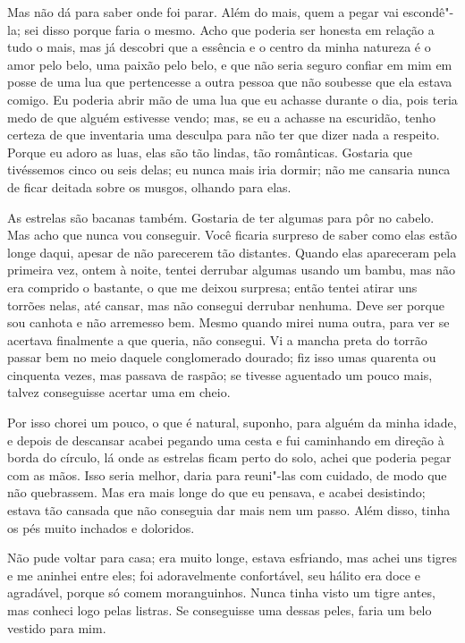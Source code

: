 Mas não dá para saber onde foi parar. Além do mais, quem a pegar vai
escondê"-la; sei disso porque faria o mesmo. Acho que poderia ser honesta em
relação a tudo o mais, mas já descobri que a essência e o centro da minha
natureza é o amor pelo belo, uma paixão pelo belo, e que não seria seguro
confiar em mim em posse de uma lua que pertencesse a outra pessoa que não
soubesse que ela estava comigo. Eu poderia abrir mão de uma lua que eu achasse
durante o dia, pois teria medo de que alguém estivesse vendo; mas, se eu a
achasse na escuridão, tenho certeza de que inventaria uma desculpa para não ter
que dizer nada a respeito. Porque eu adoro as luas, elas são tão lindas,
tão românticas. Gostaria que tivéssemos cinco ou seis delas; eu nunca mais
iria dormir; não me cansaria nunca de ficar deitada sobre os musgos, olhando para elas.

As estrelas são bacanas também. Gostaria de ter algumas para pôr no cabelo. Mas
acho que nunca vou conseguir. Você ficaria surpreso de saber como elas estão longe daqui,
apesar de não parecerem tão distantes. Quando elas apareceram
pela primeira vez, ontem à noite, tentei derrubar algumas usando um bambu, mas
não era comprido o bastante, o que me deixou surpresa; então tentei atirar uns torrões
nelas, até cansar, mas não consegui derrubar nenhuma. Deve ser porque sou
canhota e não arremesso bem. Mesmo quando mirei numa outra, para ver se
acertava finalmente a que queria, não consegui. Vi a mancha preta do torrão
passar bem no meio daquele conglomerado dourado; fiz isso umas quarenta ou
cinquenta vezes, mas passava de raspão; se tivesse aguentado um
pouco mais, talvez conseguisse acertar uma em cheio.

Por isso chorei um pouco, o que é natural, suponho, para alguém da minha idade,
e depois de descansar acabei pegando uma cesta e fui caminhando em
direção à borda do círculo, lá onde as estrelas ficam perto do solo,
achei que poderia pegar com as mãos. Isso seria melhor, daria
para reuni"-las com cuidado, de modo que não quebrassem. Mas era mais longe do que eu pensava, e
acabei desistindo; estava tão cansada que não conseguia dar mais nem um passo.
Além disso, tinha os pés muito inchados e doloridos.

Não pude voltar para casa; era muito longe, estava esfriando, mas achei uns
tigres e me aninhei entre eles; foi adoravelmente confortável, seu
hálito era doce e agradável, porque só comem moranguinhos. Nunca tinha visto um
tigre antes, mas conheci logo pelas listras. Se conseguisse uma
dessas peles, faria um belo vestido para mim.

